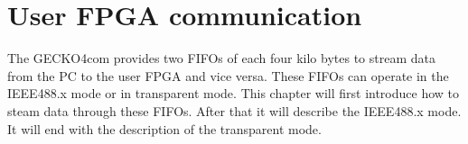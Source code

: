 \chapter{User FPGA communication}
\label{chap:fpga}
The {\sc GECKO4com} provides two FIFOs of each four kilo bytes to stream data
from the PC to the user FPGA and vice versa. These FIFOs can operate in the
IEEE488.x mode or in transparent mode. 
This chapter will first introduce how to steam data through
these FIFOs. After that it will describe the IEEE488.x mode. It will end with
the description of the transparent mode.
